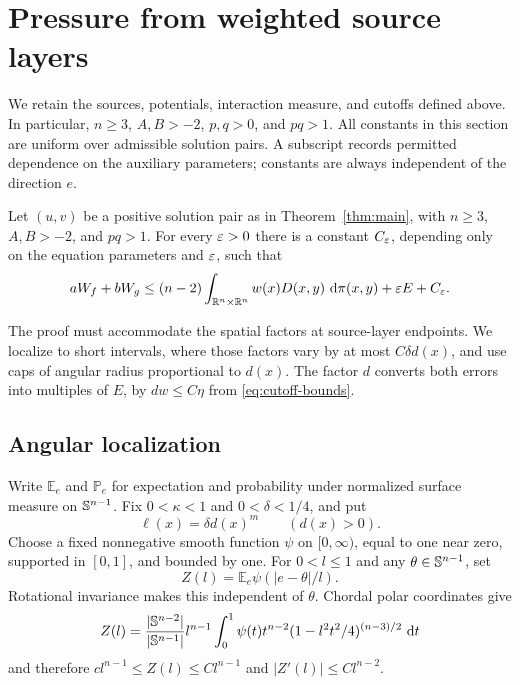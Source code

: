 \section{Pressure from weighted source layers}\label{sec:pressure}

We retain the sources, potentials, interaction measure, and cutoffs
defined above.  In particular, $n\ge3$, $A,B>-2$, $p,q>0$, and $pq>1$.
All constants in this section are uniform over admissible solution
pairs.  A subscript records permitted dependence on the auxiliary
parameters; constants are always independent of the direction $e$.

\begin{proposition}\label{prop:pressure}
Let $(u,v)$ be a positive solution pair as in Theorem~\ref{thm:main},
with $n\ge3$, $A,B>-2$, and $pq>1$.  For every $\varepsilon>0$ there is a
constant $C_\varepsilon$, depending only on the equation parameters and
$\varepsilon$, such that
\begin{equation}\label{eq:pressure}
 aW_f+bW_g
 \le(n-2)\int_{\mathbb R^n\times\mathbb R^n}w(x)D(x,y)\,\,\mathrm d\pi(x,y)
       +\varepsilon E+C_\varepsilon.
\end{equation}
\end{proposition}

The proof must accommodate the spatial factors at source-layer
endpoints.  We localize to short intervals, where those factors vary
by at most $C\delta d(x)$, and use caps of angular radius proportional
to $d(x)$.  The factor $d$ converts both errors into multiples of
$E$, by $dw\le C\eta$ from \eqref{eq:cutoff-bounds}.

\subsection{Angular localization}

Write $\mathbb E_e$ and $\mathbb P_e$ for expectation and probability
under normalized surface measure on $\mathbb S^{n-1}$.  Fix
$0<\kappa<1$ and $0<\delta<1/4$, and put
\[
 \ell(x)=\delta d(x)^m\qquad(d(x)>0).
\]
Choose a fixed nonnegative smooth function $\psi$ on $[0,\infty)$,
equal to one near zero, supported in $[0,1]$, and bounded by one.
For $0<l\le1$ and any $\theta\in\mathbb S^{n-1}$, set
\[
 Z(l)=\mathbb E_e\psi(|e-\theta|/l).
\]
Rotational invariance makes this independent of $\theta$.  Chordal
polar coordinates give
\[
 Z(l)=\frac{|\mathbb S^{n-2}|}{|\mathbb S^{n-1}|}
       l^{n-1}\int_0^1\psi(t)t^{n-2}
                  (1-l^2t^2/4)^{(n-3)/2}\,\,\mathrm d t
\]
and therefore
$c l^{n-1}\le Z(l)\le C l^{n-1}$ and
$|Z'(l)|\le C l^{n-2}$.

